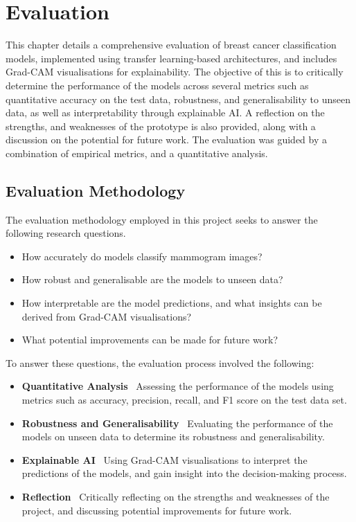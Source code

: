\documentclass[../main]{subfiles}
\begin{document}
\chapter{Evaluation}
\label{ch:evaluation}
This chapter details a comprehensive evaluation of breast cancer classification models, implemented using transfer learning-based architectures, and includes Grad-CAM visualisations for explainability. The objective of this is to critically determine the performance of the models across several metrics such as quantitative accuracy on the test data, robustness, and generalisability to unseen data, as well as interpretability through explainable AI. A reflection on the strengths, and weaknesses of the prototype is also provided, along with a discussion on the potential for future work. The evaluation was guided by a combination of empirical metrics, and a quantitative analysis.

\section{Evaluation Methodology}
\label{sec:evaluation-methodology}
The evaluation methodology employed in this project seeks to answer the following research questions.
\begin{itemize}
    \item How accurately do models classify mammogram images?
    \item How robust and generalisable are the models to unseen data?
    \item How interpretable are the model predictions, and what insights can be derived from Grad-CAM visualisations?
    \item What potential improvements can be made for future work?
\end{itemize}

To answer these questions, the evaluation process involved the following:
\begin{itemize}
    \item \textbf{Quantitative Analysis} \textemdash\ Assessing the performance of the models using metrics such as accuracy, precision, recall, and F1 score on the test data set.
    \item \textbf{Robustness and Generalisability} \textemdash\ Evaluating the performance of the models on unseen data to determine its robustness and generalisability.
    \item \textbf{Explainable AI} \textemdash\ Using Grad-CAM visualisations to interpret the predictions of the models, and gain insight into the decision-making process.
    \item \textbf{Reflection} \textemdash\ Critically reflecting on the strengths and weaknesses of the project, and discussing potential improvements for future work.
\end{itemize}
\end{document}
